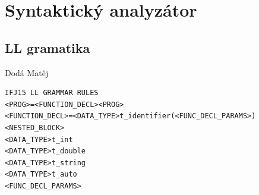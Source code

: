 \documentclass[a4paper, 12pt]{article}
\begin{document}
\begin{figure}%
    \begin{center}
    \end{center}
\end{figure}

\section{Syntaktický analyzátor} \label{parser}
\subsection{LL gramatika}
Dodá Matěj
\begin{verbatim}
IFJ15 LL GRAMMAR RULES
<PROG>=<FUNCTION_DECL><PROG>
<FUNCTION_DECL>=<DATA_TYPE>t_identifier(<FUNC_DECL_PARAMS>)<NESTED_BLOCK>
<DATA_TYPE>t_int
<DATA_TYPE>t_double
<DATA_TYPE>t_string
<DATA_TYPE>t_auto
<FUNC_DECL_PARAMS>
\end{verbatim}
\end{document}

